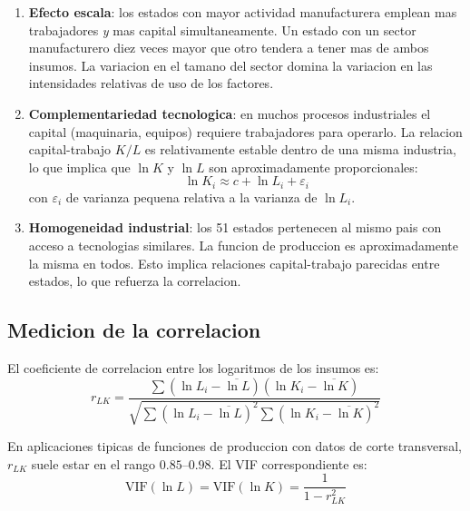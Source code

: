 \documentclass[12pt, letterpaper]{article}
\theoremstyle{remark}
\begin{document}
\begin{enumerate}[leftmargin=1.8em, itemsep=6pt]
  \item \textbf{Efecto escala}: los estados con mayor actividad manufacturera
    emplean mas trabajadores \emph{y} mas capital simultaneamente. Un estado
    con un sector manufacturero diez veces mayor que otro tendera a tener
    mas de ambos insumos. La variacion en el tamano del sector domina la
    variacion en las intensidades relativas de uso de los factores.

  \item \textbf{Complementariedad tecnologica}: en muchos procesos industriales
    el capital (maquinaria, equipos) requiere trabajadores para operarlo.
    La relacion capital-trabajo $K/L$ es relativamente estable dentro de
    una misma industria, lo que implica que $\ln K$ y $\ln L$ son
    aproximadamente proporcionales:
    \begin{equation}
      \ln K_i \approx c + \ln L_i + \varepsilon_i
      \label{eq:proporc}
    \end{equation}
    con $\varepsilon_i$ de varianza pequena relativa a la varianza de
    $\ln L_i$.

  \item \textbf{Homogeneidad industrial}: los 51 estados pertenecen al mismo
    pais con acceso a tecnologias similares. La funcion de produccion es
    aproximadamente la misma en todos. Esto implica relaciones
    capital-trabajo parecidas entre estados, lo que refuerza la correlacion.
\end{enumerate}

\subsection{Medicion de la correlacion}

El coeficiente de correlacion entre los logaritmos de los insumos es:
\begin{equation}
  r_{LK} = \frac{\sum (\ln L_i - \overline{\ln L})(\ln K_i - \overline{\ln K})}
                {\sqrt{\sum (\ln L_i - \overline{\ln L})^2
                       \sum (\ln K_i - \overline{\ln K})^2}}
  \label{eq:corr_LK}
\end{equation}

En aplicaciones tipicas de funciones de produccion con datos de corte transversal,
$r_{LK}$ suele estar en el rango $0.85$--$0.98$. El VIF correspondiente es:
\begin{equation}
  \text{VIF}(\ln L) = \text{VIF}(\ln K) = \frac{1}{1 - r_{LK}^2}
  \label{eq:VIF_LK}
\end{equation}
\end{document}
